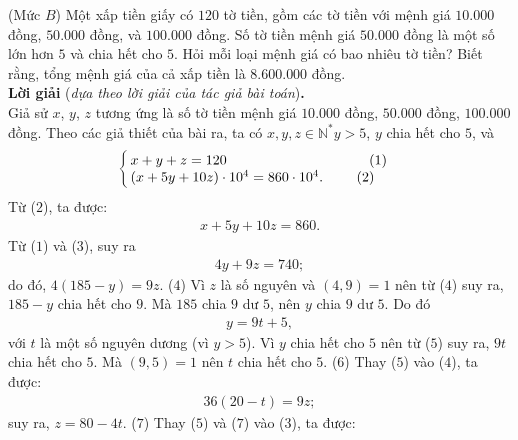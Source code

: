 \begin{multicols}{2}
	\setlength{\abovedisplayskip}{4pt}
	\setlength{\belowdisplayskip}{4pt}
	{}
	(Mức $B$) Một xấp tiền giấy có $120$ tờ tiền, gồm các tờ tiền với mệnh giá $10{.}000$ đồng, $50{.}000$ đồng, và $100{.}000$ đồng. Số tờ tiền mệnh giá $50{.}000$ đồng là một số lớn hơn $5$ và chia hết cho $5$. Hỏi mỗi loại mệnh giá có bao nhiêu tờ tiền? Biết rằng, tổng mệnh giá của cả xấp tiền là $8{.}600{.}000$ đồng.\\
	\textbf{\color{thachthuctoanhoc}Lời giải} (\textit{dựa theo lời giải của tác giả bài toán})\textbf{\color{thachthuctoanhoc}.}\\
	Giả sử $x$, $y$, $z$ tương ứng là số tờ tiền mệnh giá $10{.}000$ đồng, $50{.}000$ đồng, $100{.}000$ đồng.
	\vskip 0.01cm
	Theo các giả thiết của bài ra, ta có  $x,y,z \in \mathbb{N^*} y > 5$, $y$ chia hết cho $5$, và
	\begin{align*}
		\begin{cases}
			x + y + z = 120  \hspace*{102pt} {\color{black}(}1{\color{black})} \\[-0.5ex]
			(x + 5y + 10z) \cdot 10^4 = 860 \cdot 10^4.\hspace*{24pt} {\color{black}(}2{\color{black})} 
		\end{cases}
	\end{align*}
	Từ ($2$), ta được:
	\begin{align*}
		x + 5y + 10z = 860. \tag{$3$}
	\end{align*}
	Từ ($1$) và ($3$), suy ra
	\begin{align*}
		4y + 9z = 740;
	\end{align*}
	do đó, $4(185-y)= 9z$. \hfill ($4$)
	\vskip 0.05cm
	Vì $z$ là số nguyên và $(4, 9) = 1$ nên từ ($4$) suy ra, $185 - y$ chia hết cho $9$. Mà $185$ chia $9$ dư $5$, nên $y$ chia $9$ dư $5$. Do đó
	\begin{align*}
		y = 9t + 5,  \tag{$5$}
	\end{align*}
	với $t$ là một số nguyên dương (vì $y > 5$).
	\vskip 0.05cm
	Vì $y$ chia hết cho $5$ nên từ ($5$) suy ra, $9t$ chia hết cho $5$. Mà $(9, 5) = 1$ nên $t$ chia hết cho $5$.       \hfill           ($6$)
	\vskip 0.05cm
	Thay ($5$) vào ($4$), ta được:
	\begin{align*}
		36\left( {20 - t} \right) = 9z;
	\end{align*}
	suy ra, $z = 80 - 4t$. \hfill ($7$)
	\vskip 0.05cm
	Thay ($5$) và ($7$) vào ($3$), ta được:
	\begin{align*}

\end{align*}
\end{multicols}

